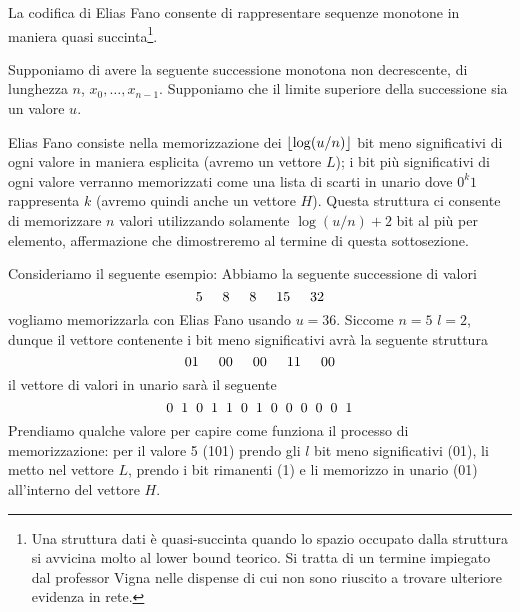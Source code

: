 La codifica di Elias Fano consente di rappresentare sequenze monotone in maniera quasi succinta\footnote{Una struttura dati è quasi-succinta quando lo spazio occupato dalla struttura si avvicina molto al lower bound teorico. Si tratta di un termine impiegato dal professor Vigna nelle dispense di cui non sono riuscito a trovare ulteriore evidenza in rete.}.

Supponiamo di avere la seguente successione monotona non decrescente, di lunghezza $n$, $x_0, \dots, x_{n - 1}$. Supponiamo che il limite superiore della successione sia un valore $u$.

Elias Fano consiste nella memorizzazione dei $\left\lfloor \log(u / n) \right\rfloor$ bit meno significativi di ogni valore in maniera esplicita (avremo un vettore $L$); i bit più significativi di ogni valore verranno memorizzati come una lista di scarti in unario dove $0^k1$ rappresenta $k$ (avremo quindi anche un vettore $H$). Questa struttura ci consente di memorizzare $n$ valori utilizzando solamente $\log(u / n) + 2$ bit al più per elemento, affermazione che dimostreremo al termine di questa sottosezione.

Consideriamo il seguente esempio: Abbiamo la seguente successione di valori
\begin{equation*}
    5\hspace{5mm}8\hspace{5mm}8\hspace{5mm}15\hspace{5mm}32
\end{equation*}
vogliamo memorizzarla con Elias Fano usando $u = 36$. Siccome $n = 5$ $l = 2$, dunque il vettore contenente i bit meno significativi avrà la seguente struttura
\begin{equation*}
    01\hspace{5mm}00\hspace{5mm}00\hspace{5mm}11\hspace{5mm}00
\end{equation*}
il vettore di valori in unario sarà il seguente
\begin{equation*}
    0\hspace{2mm}1\hspace{2mm}0\hspace{2mm}1\hspace{2mm}1\hspace{2mm}0\hspace{2mm}1\hspace{2mm}0\hspace{2mm}0\hspace{2mm}0\hspace{2mm}0\hspace{2mm}0\hspace{2mm}1
\end{equation*}
Prendiamo qualche valore per capire come funziona il processo di memorizzazione:
per il valore 5 (101) prendo gli $l$ bit meno significativi (01), li metto nel vettore $L$, prendo i bit rimanenti (1) e li memorizzo in unario (01) all'interno del vettore $H$.

